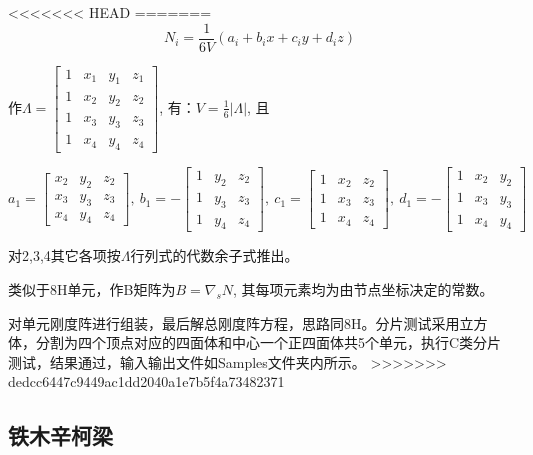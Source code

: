 \documentclass[UTF8]{ctexbook}
\begin{document}
<<<<<<< HEAD
=======
\[
N_{i}=\frac{1}{6V}(a_{i}+b_{i}x+c_{i}y+d_{i}z)
\]


作$\Lambda=\left[\begin{array}{cccc}
1 & x_{1} & y_{1} & z_{1}\\
1 & x_{2} & y_{2} & z_{2}\\
1 & x_{3} & y_{3} & z_{3}\\
1 & x_{4} & y_{4} & z_{4}
\end{array}\right]$, 有：$V=\frac{1}{6}|\Lambda|$, 且

\[
a_{1}=\left[\begin{array}{ccc}
x_{2} & y_{2} & z_{2}\\
x_{3} & y_{3} & z_{3}\\
x_{4} & y_{4} & z_{4}
\end{array}\right],\ b_{1}=-\left[\begin{array}{ccc}
1 & y_{2} & z_{2}\\
1 & y_{3} & z_{3}\\
1 & y_{4} & z_{4}
\end{array}\right],\ c_{1}=\left[\begin{array}{ccc}
1 & x_{2} & z_{2}\\
1 & x_{3} & z_{3}\\
1 & x_{4} & z_{4}
\end{array}\right],\ d_{1}=-\left[\begin{array}{ccc}
1 & x_{2} & y_{2}\\
1 & x_{3} & y_{3}\\
1 & x_{4} & y_{4}
\end{array}\right]
\]


对2,3,4其它各项按$\Lambda$行列式的代数余子式推出。

类似于8H单元，作B矩阵为$B=\nabla_{s}N$, 其每项元素均为由节点坐标决定的常数。

对单元刚度阵进行组装，最后解总刚度阵方程，思路同8H。分片测试采用立方体，分割为四个顶点对应的四面体和中心一个正四面体共5个单元，执行C类分片测试，结果通过，输入输出文件如Samples文件夹内所示。
>>>>>>> dedcc6447c9449ac1dd2040a1e7b5f4a73482371
\subsection{铁木辛柯梁}
\end{document}

